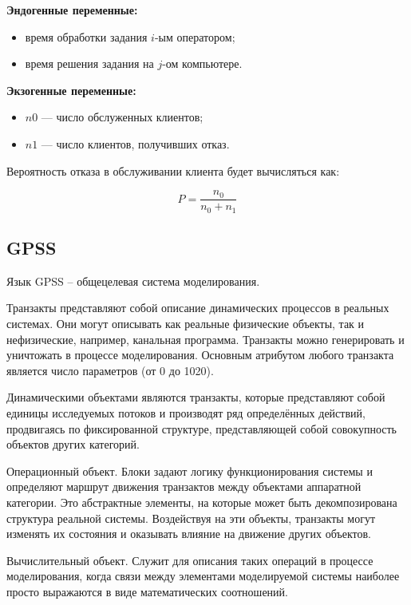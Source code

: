 \textbf{Эндогенные переменные:}

\begin{itemize}
	\item время обработки задания $i$-ым оператором;
	\item время решения задания на $j$-ом компьютере.
\end{itemize}

\textbf{Экзогенные переменные:}

\begin{itemize}
	\item $n0$ — число обслуженных клиентов;
	\item $n1$ — число клиентов, получивших отказ.
\end{itemize}

Вероятность отказа в обслуживании клиента будет вычисляться как:

\begin{equation}
	P = \frac{n_0}{n_0 + n_1}
\end{equation}

\subsection{GPSS}

Язык GPSS – общецелевая система моделирования.

Транзакты представляют собой описание динамических процессов в
реальных системах. Они могут описывать как реальные физические объекты,
так и нефизические, например, канальная программа. Транзакты можно
генерировать и уничтожать в процессе моделирования. Основным атрибутом
любого транзакта является число параметров (от 0 до 1020).

Динамическими объектами являются транзакты, которые представляют собой единицы исследуемых потоков и производят ряд определённых
действий, продвигаясь по фиксированной структуре, представляющей собой
совокупность объектов других категорий.

Операционный объект. Блоки задают логику функционирования
системы и определяют маршрут движения транзактов между объектами
аппаратной категории. Это абстрактные элементы, на которые может быть
декомпозирована структура реальной системы. Воздействуя на эти объекты,
транзакты могут изменять их состояния и оказывать влияние на движение
других объектов.

Вычислительный объект. Служит для описания таких операций
в процессе моделирования, когда связи между элементами моделируемой
системы наиболее просто выражаются в виде математических соотношений.

